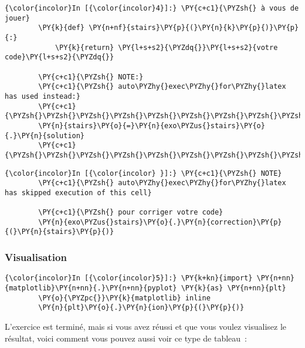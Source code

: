     \begin{Verbatim}[commandchars=\\\{\},frame=single,framerule=0.3mm,rulecolor=\color{cellframecolor}]
{\color{incolor}In [{\color{incolor}4}]:} \PY{c+c1}{\PYZsh{} à vous de jouer}
        \PY{k}{def} \PY{n+nf}{stairs}\PY{p}{(}\PY{n}{k}\PY{p}{)}\PY{p}{:}
            \PY{k}{return} \PY{l+s+s2}{\PYZdq{}}\PY{l+s+s2}{votre code}\PY{l+s+s2}{\PYZdq{}}
        
        \PY{c+c1}{\PYZsh{} NOTE:}
        \PY{c+c1}{\PYZsh{} auto\PYZhy{}exec\PYZhy{}for\PYZhy{}latex has used instead:}
        \PY{c+c1}{\PYZsh{}\PYZsh{}\PYZsh{}\PYZsh{}\PYZsh{}\PYZsh{}\PYZsh{}\PYZsh{}\PYZsh{}\PYZsh{}}
        \PY{n}{stairs}\PY{o}{=}\PY{n}{exo\PYZus{}stairs}\PY{o}{.}\PY{n}{solution}
        \PY{c+c1}{\PYZsh{}\PYZsh{}\PYZsh{}\PYZsh{}\PYZsh{}\PYZsh{}\PYZsh{}\PYZsh{}\PYZsh{}\PYZsh{}}
\end{Verbatim}


    \begin{Verbatim}[commandchars=\\\{\},frame=single,framerule=0.3mm,rulecolor=\color{cellframecolor}]
{\color{incolor}In [{\color{incolor} }]:} \PY{c+c1}{\PYZsh{} NOTE}
        \PY{c+c1}{\PYZsh{} auto\PYZhy{}exec\PYZhy{}for\PYZhy{}latex has skipped execution of this cell}
        
        \PY{c+c1}{\PYZsh{} pour corriger votre code}
        \PY{n}{exo\PYZus{}stairs}\PY{o}{.}\PY{n}{correction}\PY{p}{(}\PY{n}{stairs}\PY{p}{)}
\end{Verbatim}


    \hypertarget{visualisation}{%
\subsubsection{Visualisation}\label{visualisation}}

    \begin{Verbatim}[commandchars=\\\{\},frame=single,framerule=0.3mm,rulecolor=\color{cellframecolor}]
{\color{incolor}In [{\color{incolor}5}]:} \PY{k+kn}{import} \PY{n+nn}{matplotlib}\PY{n+nn}{.}\PY{n+nn}{pyplot} \PY{k}{as} \PY{n+nn}{plt}
        \PY{o}{\PYZpc{}}\PY{k}{matplotlib} inline
        \PY{n}{plt}\PY{o}{.}\PY{n}{ion}\PY{p}{(}\PY{p}{)}
\end{Verbatim}


    L'exercice est terminé, mais si vous avez réussi et que vous voulez
visualisez le résultat, voici comment vous pouvez aussi voir ce type de
tableau~:

